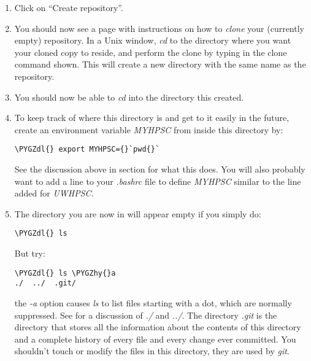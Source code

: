 \documentclass[letterpaper,10pt,english]{sphinxmanual}
\def\PYGZdl{\char`\$}
\def\PYGZhy{\char`\-}
\begin{document}
\begin{enumerate}
\item {} 
Click on ``Create repository''.

\item {} 
You should now see a page with instructions on how to \emph{clone} your
(currently empty) repository.  In a Unix window, \emph{cd} to the directory where
you want your cloned copy to reside, and perform the clone by typing in
the clone command shown.  This will create a new directory with the same
name as the repository.

\item {} 
You should now be able to \emph{cd} into the directory this created.

\item {} 
To keep track of where this directory is and get to it easily in the
future, create an environment variable \emph{MYHPSC} from inside this directory
by:

\begin{Verbatim}[commandchars=\\\{\}]
\PYGZdl{} export MYHPSC={}`pwd{}`
\end{Verbatim}

See the discussion above in section {\hyperref[git:classgit]{}} for what this does.  You
will also probably want to add a line to your \emph{.bashrc} file to define
\emph{MYHPSC} similar to the line added for \emph{UWHPSC}.

\item {} 
The directory you are now in will appear empty if you simply do:

\begin{Verbatim}[commandchars=\\\{\}]
\PYGZdl{} ls
\end{Verbatim}

But try:

\begin{Verbatim}[commandchars=\\\{\}]
\PYGZdl{} ls \PYGZhy{}a
./  ../  .git/
\end{Verbatim}

the \emph{-a} option causes \emph{ls} to list files starting with a dot, which are
normally suppressed.  See  for a discussion of \emph{./} and \emph{../}.
The directory \emph{.git} is the directory that stores all the information
about the contents of this directory and a complete history of every file
and every change ever committed.  You shouldn't touch or modify the files in
this directory, they are used by \emph{git}.


\end{enumerate}
\end{document}
